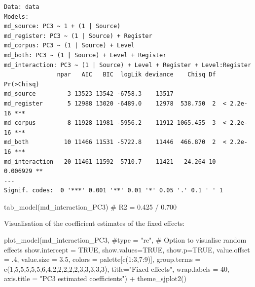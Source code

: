 \documentclass[
  letterpaper,
  DIV=11,
  numbers=noendperiod]{scrreprt}
\newenvironment{Shaded}{\begin{snugshade}}{\end{snugshade}}
\newcommand{\AttributeTok}[1]{\textcolor[rgb]{0.40,0.45,0.13}{#1}}
\newcommand{\CommentTok}[1]{\textcolor[rgb]{0.37,0.37,0.37}{#1}}
\newcommand{\ConstantTok}[1]{\textcolor[rgb]{0.56,0.35,0.01}{#1}}
\newcommand{\DecValTok}[1]{\textcolor[rgb]{0.68,0.00,0.00}{#1}}
\newcommand{\FloatTok}[1]{\textcolor[rgb]{0.68,0.00,0.00}{#1}}
\newcommand{\FunctionTok}[1]{\textcolor[rgb]{0.28,0.35,0.67}{#1}}
\newcommand{\NormalTok}[1]{\textcolor[rgb]{0.00,0.23,0.31}{#1}}
\newcommand{\SpecialCharTok}[1]{\textcolor[rgb]{0.37,0.37,0.37}{#1}}
\newcommand{\StringTok}[1]{\textcolor[rgb]{0.13,0.47,0.30}{#1}}
\begin{document}
\begin{verbatim}
Data: data
Models:
md_source: PC3 ~ 1 + (1 | Source)
md_register: PC3 ~ (1 | Source) + Register
md_corpus: PC3 ~ (1 | Source) + Level
md_both: PC3 ~ (1 | Source) + Level + Register
md_interaction: PC3 ~ (1 | Source) + Level + Register + Level:Register
               npar   AIC   BIC  logLik deviance    Chisq Df Pr(>Chisq)    
md_source         3 13523 13542 -6758.3    13517                           
md_register       5 12988 13020 -6489.0    12978  538.750  2  < 2.2e-16 ***
md_corpus         8 11928 11981 -5956.2    11912 1065.455  3  < 2.2e-16 ***
md_both          10 11466 11531 -5722.8    11446  466.870  2  < 2.2e-16 ***
md_interaction   20 11461 11592 -5710.7    11421   24.264 10   0.006929 ** 
---
Signif. codes:  0 '***' 0.001 '**' 0.01 '*' 0.05 '.' 0.1 ' ' 1
\end{verbatim}

\begin{Shaded}
\begin{Highlighting}[]
\FunctionTok{tab\_model}\NormalTok{(md\_interaction\_PC3) }\CommentTok{\# R2 = 0.425 / 0.700}
\end{Highlighting}
\end{Shaded}

Visualisation of the coefficient estimates of the fixed effects:

\begin{Shaded}
\begin{Highlighting}[]
\FunctionTok{plot\_model}\NormalTok{(md\_interaction\_PC3, }
           \CommentTok{\#type = "re", \# Option to visualise random effects }
           \AttributeTok{show.intercept =} \ConstantTok{TRUE}\NormalTok{,}
           \AttributeTok{show.values=}\ConstantTok{TRUE}\NormalTok{, }
           \AttributeTok{show.p=}\ConstantTok{TRUE}\NormalTok{,}
           \AttributeTok{value.offset =}\NormalTok{ .}\DecValTok{4}\NormalTok{,}
           \AttributeTok{value.size =} \FloatTok{3.5}\NormalTok{,}
           \AttributeTok{colors =}\NormalTok{ palette[}\FunctionTok{c}\NormalTok{(}\DecValTok{1}\SpecialCharTok{:}\DecValTok{3}\NormalTok{,}\DecValTok{7}\SpecialCharTok{:}\DecValTok{9}\NormalTok{)],}
           \AttributeTok{group.terms =} \FunctionTok{c}\NormalTok{(}\DecValTok{1}\NormalTok{,}\DecValTok{5}\NormalTok{,}\DecValTok{5}\NormalTok{,}\DecValTok{5}\NormalTok{,}\DecValTok{5}\NormalTok{,}\DecValTok{5}\NormalTok{,}\DecValTok{6}\NormalTok{,}\DecValTok{4}\NormalTok{,}\DecValTok{2}\NormalTok{,}\DecValTok{2}\NormalTok{,}\DecValTok{2}\NormalTok{,}\DecValTok{2}\NormalTok{,}\DecValTok{2}\NormalTok{,}\DecValTok{3}\NormalTok{,}\DecValTok{3}\NormalTok{,}\DecValTok{3}\NormalTok{,}\DecValTok{3}\NormalTok{,}\DecValTok{3}\NormalTok{), }
           \AttributeTok{title=}\StringTok{"Fixed effects"}\NormalTok{,}
           \AttributeTok{wrap.labels =} \DecValTok{40}\NormalTok{,}
           \AttributeTok{axis.title =} \StringTok{"PC3 estimated coefficients"}\NormalTok{) }\SpecialCharTok{+}
  \FunctionTok{theme\_sjplot2}\NormalTok{() }
\end{Highlighting}
\end{Shaded}
\end{document}

